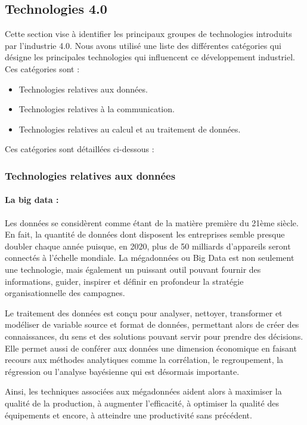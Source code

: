 \subsection{Technologies 4.0}
Cette section vise à identifier les principaux groupes de technologies introduits par l'industrie 4.0. Nous avons utilisé une liste des différentes catégories qui désigne les principales technologies qui influencent ce développement industriel. Ces catégories sont :
\begin{itemize}
    \item Technologies relatives aux données.
    \item Technologies relatives à la communication.
    \item Technologies relatives au calcul et au traitement de données.
    
\end{itemize}
Ces catégories sont détaillées ci-dessous :

\subsubsection{Technologies relatives aux données}
\paragraph{La big data : }

Les données se considèrent comme étant de la matière première du 21ème siècle. En fait, la quantité de données dont disposent les entreprises semble presque doubler chaque année puisque, en 2020, plus de 50 milliards d'appareils seront connectés à l'échelle mondiale. La mégadonnées ou Big Data est non seulement une technologie, mais également un puissant outil pouvant fournir des informations, guider, inspirer et définir en profondeur la stratégie organisationnelle des campagnes.

Le traitement des données est conçu pour analyser, nettoyer, transformer et modéliser de variable source et format de données, permettant alors de créer des connaissances, du sens et des solutions pouvant servir pour prendre des décisions. Elle permet aussi de conférer aux données une dimension économique en faisant recours aux méthodes analytiques comme la corrélation, le regroupement, la régression ou l'analyse bayésienne qui est désormais importante.

Ainsi, les techniques associées aux mégadonnées aident alors à maximiser la qualité de la production, à augmenter l'efficacité, à optimiser la qualité des équipements et encore, à atteindre une productivité sans précédent.

